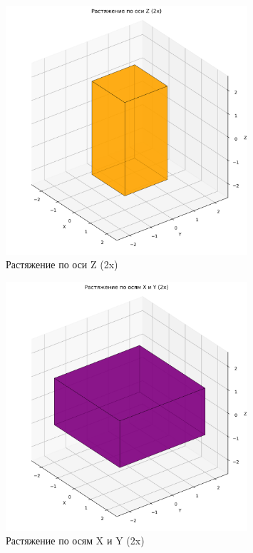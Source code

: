 \begin{figure}[H]
\centering
\includegraphics[width=0.8\textwidth]{images/task2/scale_z.png}
\caption{Растяжение по оси Z (2x)}
\end{figure}

\begin{figure}[H]
\centering
\includegraphics[width=0.8\textwidth]{images/task2/scale_xy.png}
\caption{Растяжение по осям X и Y (2x)}
\end{figure}

